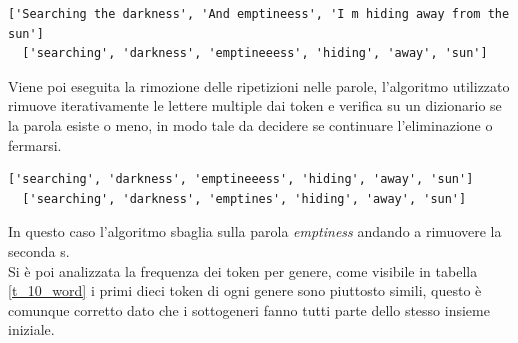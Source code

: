 \documentclass[technote]{IEEEtran}
\begin{document}
\begin{lstlisting}[basicstyle=\tiny]
  ['Searching the darkness', 'And emptineess', 'I m hiding away from the sun']  
  ['searching', 'darkness', 'emptineeess', 'hiding', 'away', 'sun']
\end{lstlisting}
Viene poi eseguita la rimozione delle ripetizioni nelle parole,
l'algoritmo utilizzato rimuove iterativamente le lettere multiple
dai token e verifica su un dizionario se la parola esiste o meno, in
modo tale da decidere se continuare l'eliminazione o fermarsi.

\begin{lstlisting}[basicstyle=\tiny]
  ['searching', 'darkness', 'emptineeess', 'hiding', 'away', 'sun']
  ['searching', 'darkness', 'emptines', 'hiding', 'away', 'sun']
\end{lstlisting}
In questo caso l'algoritmo sbaglia sulla parola \textit{emptiness} andando a rimuovere la seconda s. \\
Si è poi analizzata la frequenza dei token per genere, come visibile in tabella \ref{t_10_word} i primi dieci token di ogni genere sono piuttosto simili, questo è comunque corretto dato che i sottogeneri fanno tutti parte dello stesso insieme iniziale.
\end{document}
